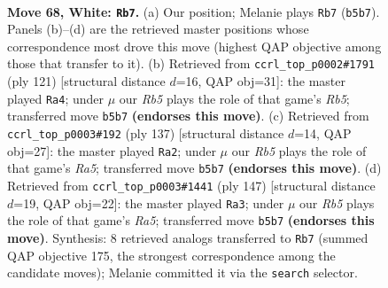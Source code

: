 \documentclass[11pt]{article}
\begin{document}
\clearpage

\begin{figure}[p]\centering
\begin{subfigure}{0.46\textwidth}\centering
\resizebox{\linewidth}{!}{%
\newchessgame
\chessboard[
  setfen={8/6p1/2N2pk1/1R5p/3P3P/6PK/r7/8 w - - 29 68},
  showmover=false,
  pgfstyle=straightmove, color=movearrow, markmove={b5-b7}
]}
\caption{}
\end{subfigure}\hfill
\begin{subfigure}{0.46\textwidth}\centering
\resizebox{\linewidth}{!}{%
\newchessgame
\chessboard[
  setfen={8/3R4/6k1/5p1p/1r5P/5PK1/6P1/8 b - - 24 61},
  showmover=false,
  pgfstyle=straightmove, color=movearrow, markmove={b4-a4}
]}
\caption{}
\end{subfigure}
\\[4pt]
\begin{subfigure}{0.46\textwidth}\centering
\resizebox{\linewidth}{!}{%
\newchessgame
\chessboard[
  setfen={8/4R3/6pk/7p/r6P/5KP1/5P2/8 b - - 45 69},
  showmover=false,
  pgfstyle=straightmove, color=movearrow, markmove={a4-a2}
]}
\caption{}
\end{subfigure}\hfill
\begin{subfigure}{0.46\textwidth}\centering
\resizebox{\linewidth}{!}{%
\newchessgame
\chessboard[
  setfen={8/2R5/6pk/7p/r6P/5P1K/6P1/8 b - - 24 74},
  showmover=false,
  pgfstyle=straightmove, color=movearrow, markmove={a4-a3}
]}
\caption{}
\end{subfigure}
\caption{\textbf{Move 68, White: \texttt{Rb7}.} (a) Our position; Melanie plays \texttt{Rb7} (\texttt{b5b7}). Panels (b)--(d) are the retrieved master positions whose correspondence most drove this move (highest QAP objective among those that transfer to it). (b) Retrieved from \texttt{ccrl\_top\_p0002\#1791} (ply 121) [structural distance $d$=16, QAP obj=31]: the master played \texttt{Ra4}; under $\mu$ our \emph{Rb5} plays the role of that game's \emph{Rb5}; transferred move \texttt{b5b7} \textbf{(endorses this move)}. (c) Retrieved from \texttt{ccrl\_top\_p0003\#192} (ply 137) [structural distance $d$=14, QAP obj=27]: the master played \texttt{Ra2}; under $\mu$ our \emph{Rb5} plays the role of that game's \emph{Ra5}; transferred move \texttt{b5b7} \textbf{(endorses this move)}. (d) Retrieved from \texttt{ccrl\_top\_p0003\#1441} (ply 147) [structural distance $d$=19, QAP obj=22]: the master played \texttt{Ra3}; under $\mu$ our \emph{Rb5} plays the role of that game's \emph{Ra5}; transferred move \texttt{b5b7} \textbf{(endorses this move)}. Synthesis: 8 retrieved analogs transferred to \texttt{Rb7} (summed QAP objective 175, the strongest correspondence among the candidate moves); Melanie committed it via the \texttt{search} selector.}
\label{fig:thought-m134}
\end{figure}
\end{document}
